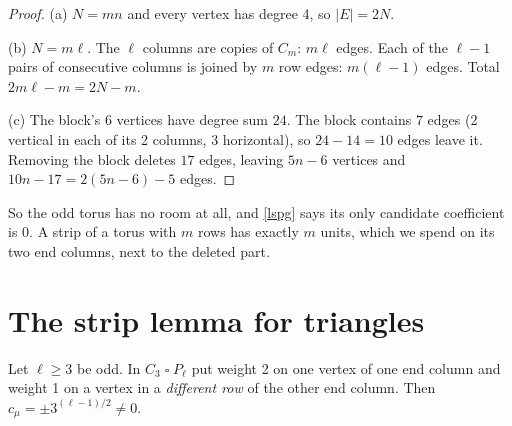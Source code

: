 \documentclass[11pt,oneside,openany]{book}
\newcounter{res}[chapter]
\renewcommand{\theres}{\thechapter.\arabic{res}}
\newenvironment{resultbox}[3]{\refstepcounter{res}\begin{tcolorbox}[breakable,colback=#1!5,colframe=#1,
  fonttitle=\bfseries,title={#2 \theres\ifx&#3&\else\ (#3)\fi}]}{\end{tcolorbox}}
\newenvironment{lemma}[1][]{\begin{resultbox}{prc}{Lemma}{#1}}{\end{resultbox}}
\newcommand{\T}{\mathbin{\square}}
\begin{document}
\begin{proof}
(a) $N = mn$ and every vertex has degree 4, so $|E| = 2N$.

(b) $N = m\ell$. The $\ell$ columns are copies of $C_m$: $m\ell$ edges. Each of the $\ell - 1$ pairs of consecutive
columns is joined by $m$ row edges: $m(\ell - 1)$ edges. Total $2m\ell - m = 2N - m$.

(c) The block's 6 vertices have degree sum $24$. The block contains $7$ edges (2 vertical in each of its 2 columns,
3 horizontal), so $24 - 14 = 10$ edges leave it. Removing the block deletes $17$ edges, leaving $5n - 6$
vertices and $10n - 17 = 2(5n - 6) - 5$ edges.
\end{proof}

So the odd torus has no room at all, and \ref{lspg} says its only candidate coefficient is $0$. A strip of a
torus with $m$ rows has exactly $m$ units, which we spend on its two end columns, next to the deleted part.

\section{The strip lemma for triangles}

\begin{lemma}[odd strip lemma, $m = 3$]\label{strip3}
Let $\ell \ge 3$ be odd. In $C_3 \T P_\ell$ put weight 2 on one vertex of one end column and weight 1 on a
vertex in a \emph{different row} of the other end column. Then $c_\mu = \pm 3^{(\ell-1)/2} \ne 0$.
\end{lemma}
\end{document}
